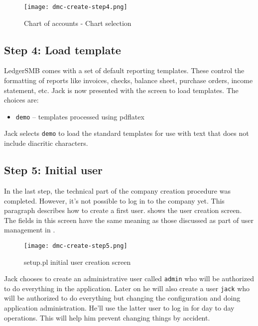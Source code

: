 \begin{figure}[h]
\centering
\texttt{[image: dmc-create-step4.png]}
\caption{Chart of accounts - Chart selection}
\label{fig:setup-step4}
\end{figure}

\subsection{Step 4: Load template}
\label{subsec-create-setup-load-template}

LedgerSMB comes with a set of default reporting templates. 
These control the formatting of reports like invoices, checks, balance sheet, purchase orders, income statement, etc. 
Jack is now presented with the screen to load templates. The choices are:
\begin{itemize}
        \item  \texttt{demo} -- templates processed using pdflatex
\end{itemize}

Jack selects  \texttt{demo} to load the standard templates for use with text that does not include \glspl{diacritic character}.

\subsection{Step 5: Initial user}
\label{subsec-create-setup-initial-user}

In the last step, the technical part of the company creation procedure was completed.
However, it's not possible to log in to the company yet. This paragraph describes how to
create a first user.
 shows the user creation screen. The fields in this screen have
the same meaning as those discussed as part of user management in .

\begin{figure}[h]
\centering
\texttt{[image: dmc-create-step5.png]}
\caption{setup.pl initial user creation screen}
\label{fig:setup-step5}
\end{figure}

Jack chooses to create an administrative user called \texttt{admin} who will be authorized
to do everything in the application. Later on he will also create a user \texttt{jack}
who will be authorized to do everything but changing the configuration and doing application administration.
He'll use the latter user to log in for day to day operations. This will help him prevent
changing things by accident.

